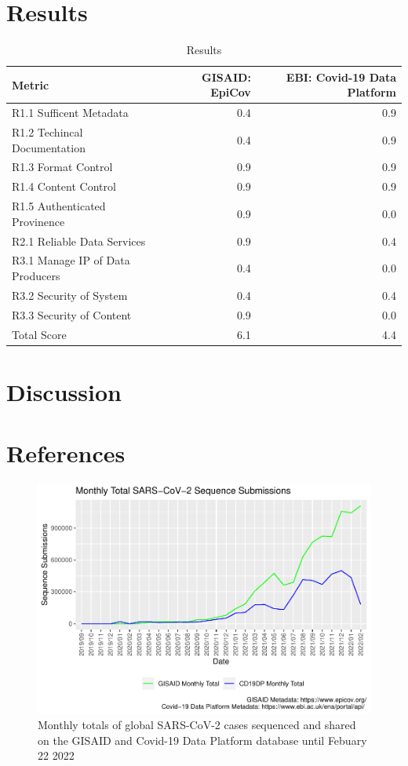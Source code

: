 \documentclass{article}
\begin{document}
\hypertarget{results}{%
\section{Results}\label{results}}

\begin{table}[H]

\caption{\label{tab:fig3}Results}
\centering
\begin{tabular}[t]{l|r|r}
\hline
Metric & GISAID: EpiCov & EBI: Covid-19 Data Platform\\
\hline
R1.1 Sufficent Metadata & 0.4 & 0.9\\
\hline
R1.2 Techincal Documentation & 0.4 & 0.9\\
\hline
R1.3 Format Control & 0.9 & 0.9\\
\hline
R1.4 Content Control & 0.9 & 0.9\\
\hline
R1.5 Authenticated Provinence & 0.9 & 0.0\\
\hline
R2.1 Reliable Data Services & 0.9 & 0.4\\
\hline
R3.1 Manage IP of Data Producers & 0.4 & 0.0\\
\hline
R3.2 Security of System & 0.4 & 0.4\\
\hline
R3.3 Security of Content & 0.9 & 0.0\\
\hline
Total Score & 6.1 & 4.4\\
\hline
\end{tabular}
\end{table}

\hypertarget{discussion}{%
\section{Discussion}\label{discussion}}

\hypertarget{references}{%
\section{References}\label{references}}

\begin{figure}
\centering
\includegraphics{Report_files/figure-latex/fig2-1.pdf}
\caption{Monthly totals of global SARS-CoV-2 cases sequenced and shared
on the GISAID and Covid-19 Data Platform database until Febuary 22 2022}
\end{figure}
\end{document}
